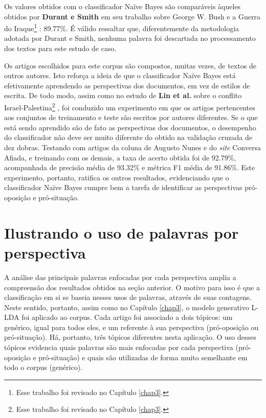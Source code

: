 Os valores obtidos com o classificador Naïve Bayes são comparáveis àqueles obtidos por \textbf{Durant e Smith} em seu trabalho sobre George W. Bush e a Guerra do Iraque\footnote{Esse trabalho foi revisado no Capítulo \ref{chap3}.} \cite{durant-smith}: 89.77\%. É válido ressaltar que, diferentemente da metodologia adotada por Durant e Smith, nenhuma palavra foi descartada no processamento dos textos para este estudo de caso.  

Os artigos escolhidos para este corpus são compostos, muitas vezes, de textos de outros autores. Isto reforça a ideia de que o classificador Naïve Bayes está efetivamente aprendendo as perspectivas dos documentos, em vez de estilos de escrita. De todo modo, assim como no estudo de \textbf{Lin et al.} sobre o conflito Israel-Palestina\footnote{Esse trabalho foi revisado no Capítulo \ref{chap3}.} \cite{lin-et-al2006}, foi conduzido um experimento em que os artigos pertencentes aos conjuntos de treinamento e teste são escritos por autores diferentes. Se o que está sendo aprendido são de fato as perspectivas dos documentos, o desempenho do classificador não deve ser muito diferente do obtido na validação cruzada de dez dobras. Testando com artigos da coluna de Augusto Nunes e do \emph{site} Conversa Afiada, e treinando com os demais, a taxa de acerto obtida foi de 92.79\%, acompanhada de precisão média de 93.32\% e métrica F1 média de 91.86\%. Este experimento, portanto, ratifica os outros resultados, evidenciando que o classificador Naïve Bayes cumpre bem a tarefa de identificar as perspectivas pró-oposição e pró-situação.






\section{Ilustrando o uso de palavras por perspectiva}
\label{estudo:sec3}

A análise das principais palavras enfocadas por cada perspectiva amplia a compreensão dos resultados obtidos na seção anterior. O motivo para isso é  que a classificação em si se baseia nesses usos de palavras, através de suas contagens. Neste sentido, portanto, assim como no Capítulo \ref{chap3}, o modelo generativo L-LDA foi aplicado ao corpus. Cada artigo foi associado a dois tópicos: um genérico, igual para todos eles, e um referente à sua perspectiva (pró-oposição ou pró-situação). Há, portanto, três tópicos diferentes nesta aplicação. O uso desses tópicos evidencia quais palavras são mais enfocadas por cada perspectiva (pró-oposição e pró-situação) e quais são utilizadas de forma muito semelhante em todo o corpus (genérico).

